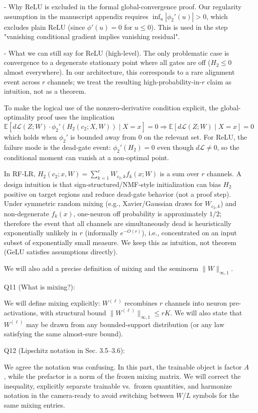 - Why ReLU is excluded in the formal global-convergence proof. Our regularity assumption in the manuscript appendix requires $\inf_u |\phi_2'(u)|>0$, which excludes plain ReLU (since $\phi'(u)=0$ for $u\le 0$). This is used in the step "vanishing conditional gradient implies vanishing residual".

- What we can still say for ReLU (high-level). The only problematic case is convergence to a degenerate stationary point where all gates are off ($H_2\le 0$ almost everywhere). In our architecture, this corresponds to a rare alignment event across $r$ channels; we treat the resulting high-probability-in-$r$ claim as intuition, not as a theorem.

To make the logical use of the nonzero-derivative condition explicit, the global-optimality proof uses the implication
$$
\mathbb E[d\mathcal L(Z;W)\cdot\phi_2'(H_2(c_2;X,W))\mid X=x]=0
\Rightarrow
\mathbb E[d\mathcal L(Z;W)\mid X=x]=0
$$
which holds when $\phi_2'$ is bounded away from $0$ on the relevant set. For ReLU, the failure mode is the dead-gate event: $\phi_2'(H_2)=0$ even though $d\mathcal L\neq 0$, so the conditional moment can vanish at a non-optimal point.

In RF-LR, $H_2(c_2;x,W)=\sum_{k=1}^r W_{c_2,k}f_k(x;W)$ is a sum over $r$ channels. A design intuition is that sign-structured/NMF-style initialization can bias $H_2$ positive on target regions and reduce dead-gate behavior (not a proof step). Under symmetric random mixing (e.g., Xavier/Gaussian draws for $W_{c_2,k}$) and non-degenerate $f_k(x)$, one-neuron off probability is approximately $1/2$; therefore the event that all channels are simultaneously dead is heuristically exponentially unlikely in $r$ (informally $e^{-O(r)}$), i.e., concentrated on an input subset of exponentially small measure. We keep this as intuition, not theorem (GeLU satisfies assumptions directly).

We will also add a precise definition of mixing and the seminorm $\|W\|_{\infty,1}$.

Q11 (What is mixing?):

We will define mixing explicitly: $W^{(\ell)}$ recombines $r$ channels into neuron pre-activations, with structural bound $\|W^{(\ell)}\|_{\infty,1}\le rK$. We will also state that $W^{(\ell)}$ may be drawn from any bounded-support distribution (or any law satisfying the same almost-sure bound).

Q12 (Lipschitz notation in Sec. 3.5--3.6):

We agree the notation was confusing. In this part, the trainable object is factor $A$, while the prefactor is a norm of the frozen mixing matrix. We will correct the inequality, explicitly separate trainable vs.\ frozen quantities, and harmonize notation in the camera-ready to avoid switching between $W$/$L$ symbols for the same mixing entries.

